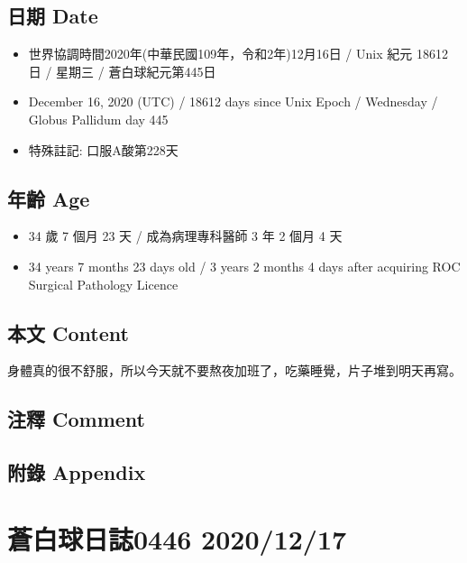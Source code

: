 \documentclass[a5paper, 10pt
]{book}
\providecommand{\tightlist}{%
  \setlength{\itemsep}{0pt}\setlength{\parskip}{0pt}}
\begin{document}
\hypertarget{ux65e5ux671f-date-15}{%
\subsection{日期 Date}\label{ux65e5ux671f-date-15}}

\begin{itemize}
\tightlist
\item
  世界協調時間2020年(中華民國109年，令和2年)12月16日 / Unix 紀元 18612
  日 / 星期三 / 蒼白球紀元第445日
\item
  December 16, 2020 (UTC) / 18612 days since Unix Epoch / Wednesday /
  Globus Pallidum day 445
\item
  特殊註記: 口服A酸第228天
\end{itemize}

\hypertarget{ux5e74ux9f61-age-15}{%
\subsection{年齡 Age}\label{ux5e74ux9f61-age-15}}

\begin{itemize}
\tightlist
\item
  34 歲 7 個月 23 天 / 成為病理專科醫師 3 年 2 個月 4 天
\item
  34 years 7 months 23 days old / 3 years 2 months 4 days after
  acquiring ROC Surgical Pathology Licence
\end{itemize}

\hypertarget{ux672cux6587-content-15}{%
\subsection{本文 Content}\label{ux672cux6587-content-15}}

身體真的很不舒服，所以今天就不要熬夜加班了，吃藥睡覺，片子堆到明天再寫。

\hypertarget{ux6ce8ux91cb-comment-15}{%
\subsection{注釋 Comment}\label{ux6ce8ux91cb-comment-15}}

\hypertarget{ux9644ux9304-appendix-15}{%
\subsection{附錄 Appendix}\label{ux9644ux9304-appendix-15}}

\hypertarget{ux84bcux767dux7403ux65e5ux8a8c0446-20201217}{%
\section{蒼白球日誌0446
2020/12/17}\label{ux84bcux767dux7403ux65e5ux8a8c0446-20201217}}
\end{document}
